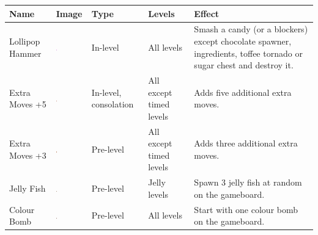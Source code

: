 
    \begin{tabular}{
  >{\raggedright\arraybackslash}m{.1\linewidth} %
  >{\centering\arraybackslash}m{.05\linewidth} %
  >{\arraybackslash}m{.1\linewidth} %
  >{\raggedright\arraybackslash}m{.1\linewidth} %
  >{\arraybackslash}m{.35\linewidth} %
}
    \toprule
    \textbf{Name} & \textbf{Image} & \textbf{Type} & \textbf{Levels} & \textbf{Effect} \\
    \midrule
    Lollipop Hammer & 
    \includegraphics[width=0.04\textwidth]{masters-thesis-master/masters-thesis/contents/a_appendix/booster_images/Booster_lollipop_hammer.png} &
    In-level &
    All levels &
    Smash a candy (or a blockers) except chocolate spawner, ingredients, toffee tornado or sugar chest and destroy it.\\ 
    Extra Moves +5 & 
    \includegraphics[width=0.04\textwidth]{masters-thesis-master/masters-thesis/contents/a_appendix/booster_images/Booster_extra_moves_5.png} &
    In-level, consolation &
    All except timed levels &
    Adds five additional extra moves.\\ 
    Extra Moves +3 & 
    \includegraphics[width=0.04\textwidth]{masters-thesis-master/masters-thesis/contents/a_appendix/booster_images/Booster_extra_moves_3.png} &
    Pre-level &
    All except timed levels &
    Adds three additional extra moves.\\
    Jelly Fish & 
    \includegraphics[width=0.04\textwidth]{masters-thesis-master/masters-thesis/contents/a_appendix/booster_images/Booster_jelly_fish.png} &
    Pre-level &
    Jelly levels &
    Spawn 3 jelly fish at random on the gameboard.\\ 
    Colour Bomb & 
    \includegraphics[width=0.04\textwidth]{masters-thesis-master/masters-thesis/contents/a_appendix/booster_images/Booster_color_bomb.png} &
    Pre-level &
    All levels &
    Start with one colour bomb on the gameboard.\\ 

\end{tabular}

